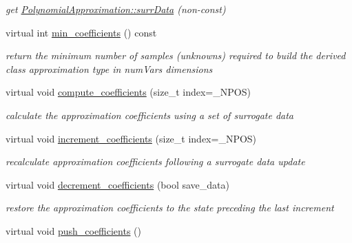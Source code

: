 \begin{DoxyCompactItemize}
\begin{DoxyCompactList}\small\item\em get \hyperlink{classPecos_1_1PolynomialApproximation_a8e8d62a29dcb5dd55fd03bef1a2b3ea6}{Polynomial\+Approximation\+::surr\+Data} (non-\/const) \end{DoxyCompactList}\item 
virtual int \hyperlink{classPecos_1_1BasisApproximation_ac789358ee49633613d6c97593be06f9d}{min\+\_\+coefficients} () const \label{classPecos_1_1BasisApproximation_ac789358ee49633613d6c97593be06f9d}

\begin{DoxyCompactList}\small\item\em return the minimum number of samples (unknowns) required to build the derived class approximation type in num\+Vars dimensions \end{DoxyCompactList}\item 
virtual void \hyperlink{classPecos_1_1BasisApproximation_aef8f0c32bdeff7756a9c614607c03058}{compute\+\_\+coefficients} (size\+\_\+t index=\+\_\+\+N\+P\+OS)\label{classPecos_1_1BasisApproximation_aef8f0c32bdeff7756a9c614607c03058}

\begin{DoxyCompactList}\small\item\em calculate the approximation coefficients using a set of surrogate data \end{DoxyCompactList}\item 
virtual void \hyperlink{classPecos_1_1BasisApproximation_a8ba12605934048176c1d1c5722465523}{increment\+\_\+coefficients} (size\+\_\+t index=\+\_\+\+N\+P\+OS)\label{classPecos_1_1BasisApproximation_a8ba12605934048176c1d1c5722465523}

\begin{DoxyCompactList}\small\item\em recalculate approximation coefficients following a surrogate data update \end{DoxyCompactList}\item 
virtual void \hyperlink{classPecos_1_1BasisApproximation_a662fd880fee0ed53f1e3383c41d6b792}{decrement\+\_\+coefficients} (bool save\+\_\+data)\label{classPecos_1_1BasisApproximation_a662fd880fee0ed53f1e3383c41d6b792}

\begin{DoxyCompactList}\small\item\em restore the approximation coefficients to the state preceding the last increment \end{DoxyCompactList}\item 
virtual void \hyperlink{classPecos_1_1BasisApproximation_a150c32326f6c12d2303806005715706e}{push\+\_\+coefficients} ()\label{classPecos_1_1BasisApproximation_a150c32326f6c12d2303806005715706e}


\end{DoxyCompactItemize}

